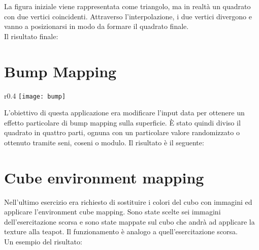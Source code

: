 La figura iniziale viene rappresentata come triangolo, ma in realtà un quadrato con due vertici coincidenti. Attraverso l'interpolazione, i due vertici divergono e vanno a posizionarsi in modo da formare il quadrato finale.\\
\newpage
Il risultato finale:
\begin{figure}[hbt]
    \centering
    \vspace{-0.5cm}
\end{figure}


\section{Bump Mapping}
\begin{wrapfigure}{r}{0.4\textwidth} %
    \centering
    \vspace{-1.5cm}
    \texttt{[image: bump]}
    \caption{\label{fig:bump}}
    \vspace{-2cm}
\end{wrapfigure}
L'obiettivo di questa applicazione era modificare l'input data per ottenere un effetto particolare di bump mapping sulla superficie. È stato quindi diviso il quadrato in quattro parti, ognuna con un particolare valore randomizzato o ottenuto tramite seni, coseni o modulo. Il risultato è il seguente:


\vspace{3cm}
\section{Cube environment mapping}
Nell'ultimo esercizio era richiesto di sostituire i colori del cubo con immagini ed applicare l'environment cube mapping.
Sono state scelte sei immagini dell'esercitazione scorsa e sono state mappate sul cubo che andrà ad applicare la texture alla teapot. Il funzionamento è analogo a quell'esercitazione scorsa. \\

Un esempio del risultato:
\begin{figure}[hbt]
    \centering
    \vspace{-0.5cm}
\end{figure}







































%